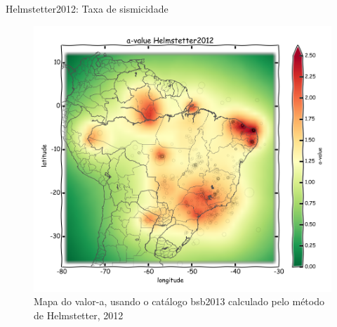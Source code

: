 \documentclass[ucs,8pt]{beamer}
\begin{document}
\begin{frame}{Helmstetter2012: Taxa de sismicidade}
\begin{figure}[H]
  \centering
  \includegraphics[height=.95\textheight]{a_helmstetter} 
  \caption{Mapa do valor-a, usando o catálogo \gls{bsb2013} calculado pelo método de Helmstetter, 2012 }
  \label{fig:helm_r} 
\end{figure}
\end{frame}
\end{document}
